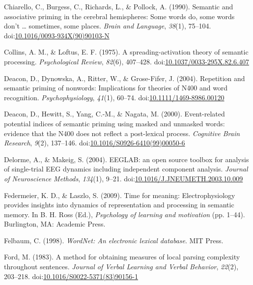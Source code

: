 \documentclass[english,man]{apa6}
\theoremstyle{definition}
\theoremstyle{definition}
\theoremstyle{definition}
\theoremstyle{remark}
\begin{document}
\hypertarget{ref-Chiarello1990}{}
Chiarello, C., Burgess, C., Richards, L., \& Pollock, A. (1990).
Semantic and associative priming in the cerebral hemispheres: Some words
do, some words don't \ldots{} sometimes, some places. \emph{Brain and
Language}, \emph{38}(1), 75--104.
doi:\href{https://doi.org/10.1016/0093-934X(90)90103-N}{10.1016/0093-934X(90)90103-N}

\hypertarget{ref-Collins1975}{}
Collins, A. M., \& Loftus, E. F. (1975). A spreading-activation theory
of semantic processing. \emph{Psychological Review}, \emph{82}(6),
407--428.
doi:\href{https://doi.org/10.1037/0033-295X.82.6.407}{10.1037/0033-295X.82.6.407}

\hypertarget{ref-Deacon2004}{}
Deacon, D., Dynowska, A., Ritter, W., \& Grose-Fifer, J. (2004).
Repetition and semantic priming of nonwords: Implications for theories
of N400 and word recognition. \emph{Psychophysiology}, \emph{41}(1),
60--74.
doi:\href{https://doi.org/10.1111/1469-8986.00120}{10.1111/1469-8986.00120}

\hypertarget{ref-Deacon2000}{}
Deacon, D., Hewitt, S., Yang, C.-M., \& Nagata, M. (2000). Event-related
potential indices of semantic priming using masked and unmasked words:
evidence that the N400 does not reflect a post-lexical process.
\emph{Cognitive Brain Research}, \emph{9}(2), 137--146.
doi:\href{https://doi.org/10.1016/S0926-6410(99)00050-6}{10.1016/S0926-6410(99)00050-6}

\hypertarget{ref-Delorme2004}{}
Delorme, A., \& Makeig, S. (2004). EEGLAB: an open source toolbox for
analysis of single-trial EEG dynamics including independent component
analysis. \emph{Journal of Neuroscience Methods}, \emph{134}(1), 9--21.
doi:\href{https://doi.org/10.1016/J.JNEUMETH.2003.10.009}{10.1016/J.JNEUMETH.2003.10.009}

\hypertarget{ref-Federmeier2009}{}
Federmeier, K. D., \& Laszlo, S. (2009). Time for meaning:
Electrophysiology provides insights into dynamics of representation and
processing in semantic memory. In B. H. Ross (Ed.), \emph{Psychology of
learning and motivation} (pp. 1--44). Burlington, MA: Academic Press.

\hypertarget{ref-Felbaum1998}{}
Felbaum, C. (1998). \emph{WordNet: An electronic lexical database}. MIT
Press.

\hypertarget{ref-Ford1983}{}
Ford, M. (1983). A method for obtaining measures of local parsing
complexity throughout sentences. \emph{Journal of Verbal Learning and
Verbal Behavior}, \emph{22}(2), 203--218.
doi:\href{https://doi.org/10.1016/S0022-5371(83)90156-1}{10.1016/S0022-5371(83)90156-1}
\end{document}
